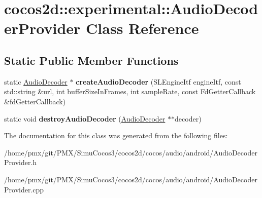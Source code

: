\hypertarget{classcocos2d_1_1experimental_1_1AudioDecoderProvider}{}\section{cocos2d\+:\+:experimental\+:\+:Audio\+Decoder\+Provider Class Reference}
\label{classcocos2d_1_1experimental_1_1AudioDecoderProvider}
\subsection*{Static Public Member Functions}
\begin{DoxyCompactItemize}
\item 
\mbox{\label{classcocos2d_1_1experimental_1_1AudioDecoderProvider_a6198a553240de0198ba5635422ab7ae4}} 
static \hyperlink{classcocos2d_1_1experimental_1_1AudioDecoder}{Audio\+Decoder} $\ast$ {\bfseries create\+Audio\+Decoder} (S\+L\+Engine\+Itf engine\+Itf, const std\+::string \&url, int buffer\+Size\+In\+Frames, int sample\+Rate, const Fd\+Getter\+Callback \&fd\+Getter\+Callback)
\item 
\mbox{\label{classcocos2d_1_1experimental_1_1AudioDecoderProvider_ac639e70bad708b963036cc919357567e}} 
static void {\bfseries destroy\+Audio\+Decoder} (\hyperlink{classcocos2d_1_1experimental_1_1AudioDecoder}{Audio\+Decoder} $\ast$$\ast$decoder)
\end{DoxyCompactItemize}


The documentation for this class was generated from the following files\+:\begin{DoxyCompactItemize}
\item 
/home/pmx/git/\+P\+M\+X/\+Simu\+Cocos3/cocos2d/cocos/audio/android/Audio\+Decoder\+Provider.\+h\item 
/home/pmx/git/\+P\+M\+X/\+Simu\+Cocos3/cocos2d/cocos/audio/android/Audio\+Decoder\+Provider.\+cpp\end{DoxyCompactItemize}
